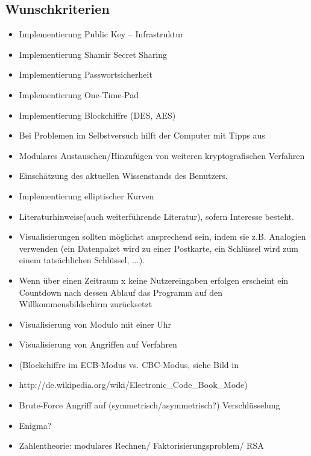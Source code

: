 \documentclass{article}
\begin{document}
\subsection{Wunschkriterien}

\begin{itemize}
    \item Implementierung Public Key – Infrastruktur
    \item Implementierung Shamir Secret Sharing
    \item Implementierung Passwortsicherheit
    \item Implementierung One-Time-Pad
    \item Implementierung Blockchiffre (DES, AES)
    \item Bei Problemen im Selbstversuch hilft der Computer mit Tipps aus
    \item Modulares Austauschen/Hinzufügen von weiteren kryptografischen Verfahren
    \item Einschätzung des aktuellen Wissenstands des Benutzers.
    \item Implementierung elliptischer Kurven
    \item Literaturhinweise(auch weiterführende Literatur), sofern Interesse besteht.
    \item Visualisierungen sollten möglichst ansprechend sein, indem sie z.B. Analogien 
        verwenden (ein Datenpaket wird zu einer Postkarte, ein Schlüssel wird zum einem tatsächlichen Schlüssel, ...).
    \item Wenn über einen Zeitraum x keine Nutzereingaben erfolgen erscheint ein Countdown 
        nach dessen Ablauf das Programm auf den Willkommensbildschirm zurücksetzt
    \item Visualisierung von Modulo mit einer Uhr
    \item Visualisierung von Angriffen auf Verfahren
    \item (Blockchiffre im ECB-Modus vs. CBC-Modus, siehe Bild in 
    \item http://de.wikipedia.org/wiki/Electronic\_Code\_Book\_Mode)
    \item Brute-Force Angriff auf (symmetrisch/asymmetrisch?) Verschlüsselung
    \item Enigma?
    \item Zahlentheorie: modulares Rechnen/ Faktorisierungsproblem/ RSA
\end{itemize}
\end{document}
